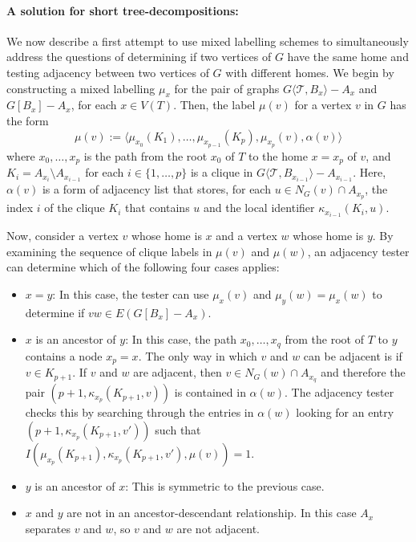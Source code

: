 \documentclass{patmorin}
\newcommand{\torso}[2]{{#1}\langle{#2}\rangle}
\newcommand{\calT}{\mathcal{T}}
\begin{document}
\paragraph{A solution for short tree-decompositions:}
We now describe a first attempt to use mixed labelling schemes to simultaneously address the questions of determining if two vertices of $G$ have the same home and testing adjacency between two vertices of $G$ with different homes.  We begin by constructing a mixed labelling $\mu_x$ for the pair of graphs $\torso{G}{\calT,B_x}-A_x$ and $G[B_x]-A_x$, for each $x\in V(T)$.  Then, the label $\mu(v)$ for a vertex $v$ in $G$ has the form
\[
  \mu(v):=\langle \mu_{x_0}(K_1),\ldots,\mu_{x_{p-1}}(K_p),\mu_{x_p}(v),\alpha(v)\rangle
\]
where $x_0,\ldots,x_p$ is the path from the root $x_0$ of $T$ to the home $x=x_p$ of $v$, and $K_i=A_{x_i}\setminus A_{x_{i-1}}$ for each $i\in\{1,\ldots,p\}$ is a clique in $\torso{G}{\calT,B_{x_{i-1}}}-A_{x_{i-1}}$.  Here, $\alpha(v)$ is a form of adjacency list that stores, for each $u\in N_G(v)\cap A_{x_p}$, the index $i$ of the clique $K_i$ that contains $u$ and the local identifier $\kappa_{x_{i-1}}(K_i,u)$.

Now, consider a vertex $v$ whose home is $x$ and a vertex $w$ whose home is $y$.  By examining the sequence of clique labels in $\mu(v)$ and $\mu(w)$, an adjacency tester can determine which of the following four cases applies:
\begin{itemize}[nosep,nolistsep]
  \item $x=y$: In this case, the tester can use $\mu_x(v)$ and $\mu_y(w)=\mu_x(w)$ to determine if $vw\in E(G[B_x]-A_x)$.
  \item $x$ is an ancestor of $y$:  In this case, the path $x_0,\ldots,x_q$ from the root of $T$ to $y$ contains a node $x_p=x$.  The only way in which $v$ and $w$ can be adjacent is if $v\in K_{p+1}$.  If $v$ and $w$ are adjacent, then $v\in N_G(w)\cap A_{x_q}$ and therefore the pair $(p+1,\kappa_{x_p}(K_{p+1}, v))$ is contained in $\alpha(w)$. The adjacency tester checks this by searching through the entries in $\alpha(w)$ looking for an entry $(p+1,\kappa_{x_p}(K_{p+1}, v'))$ such that $I(\mu_{x_p}(K_{p+1}),\kappa_{x_p}(K_{p+1},v'),\mu(v))=1$.
  \item $y$ is an ancestor of $x$: This is symmetric to the previous case.
  \item $x$ and $y$ are not in an ancestor-descendant relationship.  In this case $A_x$ separates $v$ and $w$, so $v$ and $w$ are not adjacent.
\end{itemize}
\end{document}
